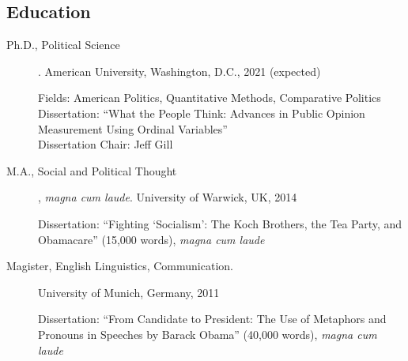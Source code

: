 \documentclass[11pt]{article}
\begin{document}
\begin{flushleft}

\section*{Education}

\begin{description}
\item[{\sc Ph.D.}, Political Science]\hspace{-0.175cm}. American University,
Washington, D.C., 2021 (expected) \par
Fields: American Politics, Quantitative Methods, Comparative Politics \\ 
Dissertation: ``What the People Think: Advances in Public Opinion Measurement Using Ordinal Variables''\\
Dissertation Chair: Jeff Gill\\
\end{description}

\begin{description}
\item[{\sc M.A.}, Social and Political Thought]\hspace{-0.175cm}, \textit{magna cum laude}. University of Warwick, UK, 2014 \par
Dissertation: ``Fighting `Socialism': The Koch Brothers, the Tea Party, and Obamacare'' (15,000 words), \textit{magna cum laude} \\
\end{description}

\begin{description}
\item[{\sc Magister}, English Linguistics, Communication.] University of Munich, Germany, 2011 \par
Dissertation: ``From Candidate to President: The Use of Metaphors and Pronouns in Speeches by Barack Obama'' (40,000 words), \textit{magna cum laude} \\
\end{description}



\end{flushleft}
\end{document}
